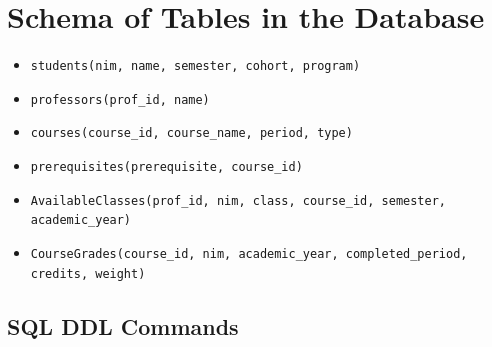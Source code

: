 \section{Schema of Tables in the Database}

\begin{tcolorbox}[title=Table Schema in the Academic Database]
\begin{itemize}
    \itemsep0em
    \item \texttt{students(nim, name, semester, cohort, program)}
    \item \texttt{professors(prof\_id, name)}
    \item \texttt{courses(course\_id, course\_name, period, type)}
    \item \texttt{prerequisites(prerequisite, course\_id)}
    \item \texttt{AvailableClasses(prof\_id, nim, class, course\_id, semester, academic\_year)}
    \item \texttt{CourseGrades(course\_id, nim, academic\_year, completed\_period, credits, weight)}
\end{itemize}
\end{tcolorbox}

\subsection{SQL DDL Commands}

